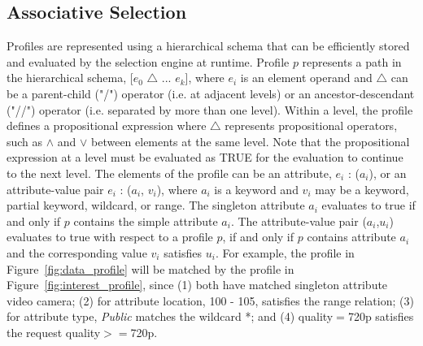 \subsection{Associative Selection} 

Profiles are represented using a hierarchical schema that can be efficiently stored and evaluated by the selection engine at runtime. Profile $p$ represents a path in the hierarchical schema, [$e_0$ $\bigtriangleup$ ... $e_k$], where $e_i$ is an element operand and $\bigtriangleup$ can be a parent-child ("/") operator (i.e. at adjacent levels) or an ancestor-descendant ("//") operator (i.e. separated by more than one level). Within a level, the profile defines a propositional expression where $\bigtriangleup$ represents propositional operators, such as $\wedge$ and $\vee$ between elements at the same level. Note that the propositional expression at a level must be evaluated as TRUE for the evaluation to continue to the next level. The elements of the profile can be an attribute, $e_i$ : ($a_i$), or an attribute-value pair $e_i$ : ($a_i$, $v_i$), where $a_i$ is a keyword and $v_i$ may be a keyword, partial keyword, wildcard, or range. The singleton attribute $a_i$ evaluates to true if and only if $p$ contains the simple attribute $a_i$. The attribute-value pair ($a_i$,$u_i$) evaluates to true with respect to a profile $p$, if and only if $p$ contains attribute $a_i$ and the corresponding value $v_i$ satisfies $u_i$. For example, the profile in Figure~\ref{fig:data_profile} will be matched by the profile in Figure~\ref{fig:interest_profile}, since (1) both have matched singleton attribute video camera; (2) for attribute location, 100 - 105, satisfies the range relation; (3) for attribute type, {\it Public} matches the wildcard *; and (4) quality$=$720p satisfies the request quality$>=$720p. 
\\

